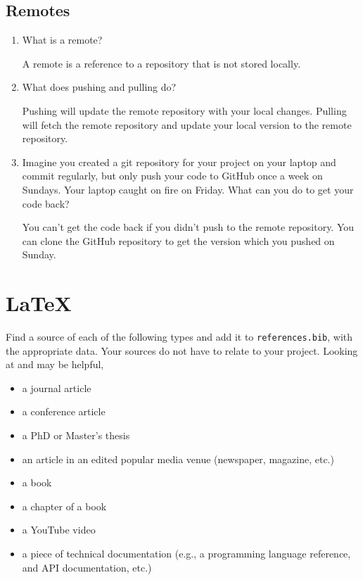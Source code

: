 \documentclass[10pt,twocolumn]{article}
\begin{document}
\subsection{Remotes}

\begin{enumerate}
\item What is a remote?\newline
\par A remote is a reference to a repository that is not stored locally. \newline
\item What does pushing and pulling do?\newline
\par Pushing will update the remote repository with your local changes. Pulling will fetch the remote repository and update your local version to the remote repository.\newline
\item Imagine you created a git repository for your project on your laptop and commit regularly, but only push your code to GitHub once a week on Sundays. Your laptop caught on fire on Friday. What can you do to get your code back?\newline
\par You can't get the code back if you didn't push to the remote repository. You can clone the GitHub repository to get the version which you pushed on Sunday. \newline
\end{enumerate}

\section{\LaTeX}

Find a source of each of the following types and add it to \texttt{references.bib}, with the appropriate data. Your sources do not have to relate to your project. Looking at \textcite{OverleafBibliographyManagement} and \textcite{WikipediaBibtex} may be helpful,

\begin{itemize}
\item a journal article
\item a conference article
\item a PhD or Master's thesis
\item an article in an edited popular media venue (newspaper, magazine, etc.)
\item a book
\item a chapter of a book
\item a YouTube video
\item a piece of technical documentation (e.g., a programming language reference, and API documentation, etc.)
\end{itemize}
\end{document}
